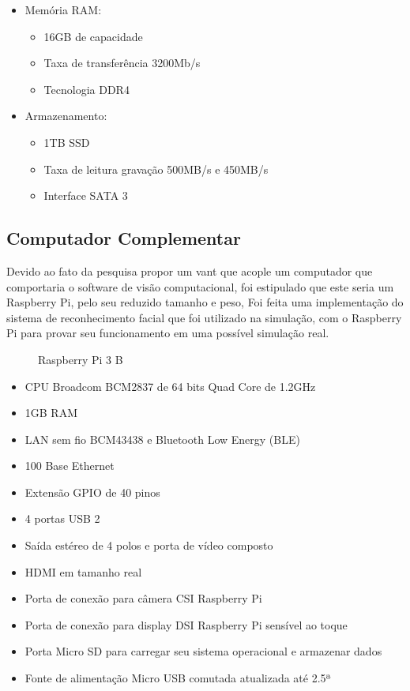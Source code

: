 \begin{itemize}
	\begin{itemize}
		\item Memória RAM:
		\begin{itemize}
			\item 16GB de capacidade
			\item Taxa de transferência 3200Mb/s 
			\item Tecnologia DDR4
		\end{itemize}
	\end{itemize}

	\begin{itemize}
		\item Armazenamento:
		\begin{itemize}
			\item 1TB SSD
			\item Taxa de leitura gravação 500MB/s e 450MB/s
			\item Interface SATA 3
		\end{itemize}
	\end{itemize}
\end{itemize}

\subsection{Computador Complementar}

Devido ao fato da pesquisa propor um vant que acople um computador que comportaria o software de visão computacional, foi estipulado que este seria um Raspberry Pi, pelo seu reduzido tamanho e peso, Foi feita uma implementação do sistema de reconhecimento facial que foi utilizado na simulação, com o Raspberry Pi para provar seu funcionamento em uma possível simulação real. 

\begin{figure}[H]
	\centering	
	\caption{Raspberry Pi 3 B}
	\def\svgwidth{15cm}
	
	\label{fig:gpiorasp}
\end{figure}

\begin{itemize}
	\item CPU Broadcom BCM2837 de 64 bits Quad Core de 1.2GHz
	\item 1GB RAM
	\item LAN sem fio BCM43438 e Bluetooth Low Energy (BLE)
	\item 100 Base Ethernet
	\item Extensão GPIO de 40 pinos
	\item 4 portas USB 2
	\item Saída estéreo de 4 polos e porta de vídeo composto
	\item HDMI em tamanho real
	\item Porta de conexão para câmera CSI Raspberry Pi
	\item Porta de conexão para display DSI Raspberry Pi sensível ao toque
	\item Porta Micro SD para carregar seu sistema operacional e armazenar dados
	\item Fonte de alimentação Micro USB comutada atualizada até 2.5ª
\end{itemize}

